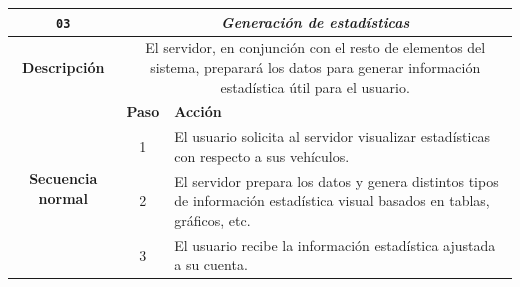 \begin{table}[H]
  \centering
  \begin{tabularx}{\textwidth}{|c|c|X|}
    \hline
    \texttt{03}                                & \multicolumn{2}{c|}{\textit{Generación de estadísticas}}                                                                                                                                                                                                                                                                \\
    \hline
    \textbf{Descripción}                       & \multicolumn{2}{X|}{El servidor, en conjunción con el resto de elementos del sistema, preparará los datos para generar información estadística útil para el usuario.}                                                                                                                                                   \\
    \hline
    \multirow{7}{*}{\textbf{Secuencia normal}} & \textbf{Paso}                                                                                                                                                         & \textbf{Acción}                                                                                                                                 \\
    \cline{2-3}
                                               & 1                                                                                                                                                                     & \multicolumn{1}{L|}{El usuario solicita al servidor visualizar estadísticas con respecto a sus vehículos.}                                      \\
    \cline{2-3}
                                               & 2                                                                                                                                                                     & \multicolumn{1}{L|}{El servidor prepara los datos y genera distintos tipos de información estadística visual basados en tablas, gráficos, etc.} \\
    \cline{2-3}
                                               & 3                                                                                                                                                                     & \multicolumn{1}{L|}{El usuario recibe la información estadística ajustada a su cuenta.}                                                         \\

\end{tabularx}
\end{table}
